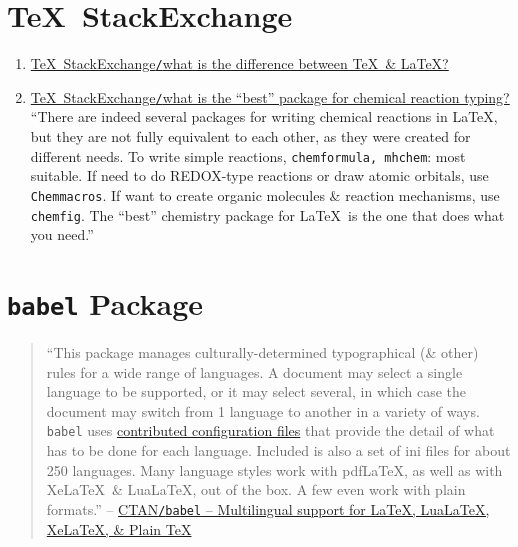 \documentclass{article}
\begin{document}
\section{\TeX\ StackExchange}

\begin{enumerate}
	\item \href{https://tex.stackexchange.com/questions/49/what-is-the-difference-between-tex-and-latex}{\TeX\ StackExchange{\tt/}what is the difference between \TeX\ \& \LaTeX?}
	\item \href{https://tex.stackexchange.com/questions/652208/what-is-the-best-package-for-chemical-reaction-typing}{\TeX\ StackExchange{\tt/}what is the ``best'' package for chemical reaction typing?} ``There are indeed several packages for writing chemical reactions in \LaTeX, but they are not fully equivalent to each other, as they were created for different needs. To write simple reactions, {\tt chemformula, mhchem}: most suitable. If need to do REDOX-type reactions or draw atomic orbitals, use {\tt Chemmacros}. If want to create organic molecules \& reaction mechanisms, use {\tt chemfig}. The ``best'' chemistry package for \LaTeX\ is the one that does what you need.''
\end{enumerate}


\section{{\tt babel} Package}
\begin{quotation}
	``This package manages culturally-determined typographical (\& other) rules for a wide range of languages. A document may select a single language to be supported, or it may select several, in which case the document may switch from 1 language to another in a variety of ways. {\tt babel} uses \href{https://ctan.org/pkg/babel-contrib}{contributed configuration files} that provide the detail of what has to be done for each language. Included is also a set of ini files for about 250 languages. Many language styles work with pdf\LaTeX, as well as with Xe\LaTeX\ \& Lua\LaTeX, out of the box. A few even work with plain formats.'' -- \href{https://ctan.org/pkg/babel}{CTAN{\tt /}{\tt babel} -- Multilingual support for \LaTeX, Lua\LaTeX, Xe\LaTeX, \& Plain \TeX}
\end{quotation}

\end{document}
